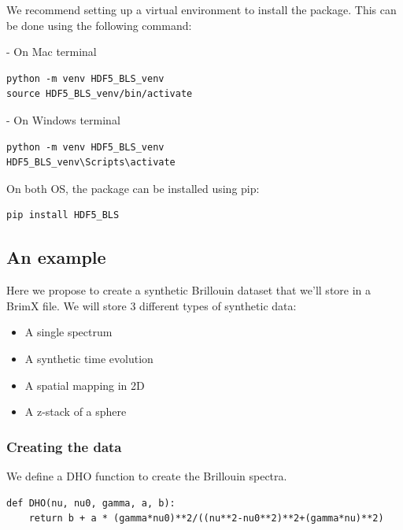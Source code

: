 \documentclass{article}
\begin{document}
We recommend setting up a virtual environment to install the package. This can be done using the following command:

\begin{tcolorbox}[colback=blue!5, colframe=blue!40!black, boxrule=0.5mm, sharp corners, left=2mm, right=2mm, top=1mm, bottom=1mm]
- On Mac terminal
\begin{lstlisting}
python -m venv HDF5_BLS_venv
source HDF5_BLS_venv/bin/activate 
\end{lstlisting}
\end{tcolorbox}

\begin{tcolorbox}[colback=yellow!5, colframe=yellow!40!black, boxrule=0.5mm, sharp corners, left=2mm, right=2mm, top=1mm, bottom=1mm]
- On Windows terminal
\begin{lstlisting}
python -m venv HDF5_BLS_venv
HDF5_BLS_venv\Scripts\activate
\end{lstlisting}
\end{tcolorbox}

On both OS, the package can be installed using pip:
\begin{lstlisting}
pip install HDF5_BLS
\end{lstlisting}


\subsection{An example}

Here we propose to create a synthetic Brillouin dataset that we'll store in a BrimX file. We will store 3 different types of synthetic data:
\begin{itemize}
    \item A single spectrum 
    \item A synthetic time evolution
    \item A spatial mapping in 2D
    \item A z-stack of a sphere
\end{itemize}

\subsubsection{Creating the data}

We define a DHO function to create the Brillouin spectra.

\begin{lstlisting}
def DHO(nu, nu0, gamma, a, b):
    return b + a * (gamma*nu0)**2/((nu**2-nu0**2)**2+(gamma*nu)**2)
\end{lstlisting}
\end{document}
